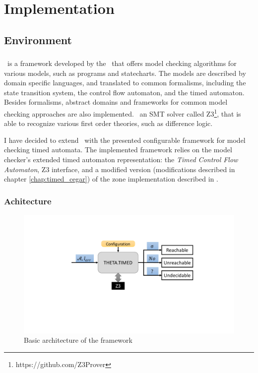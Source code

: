 \chapter{Implementation}\label{chap:impl}

\section{Environment}

\subsection{\ttmc}

\ttmc\ is a framework developed by the \bmemit\ that offers model checking algorithms for various models, such as programs and statecharts. The models are described by domain specific languages, and translated to common formalisms, including the state transition system, the control flow automaton, and the timed automaton. Besides formalisms, abstract domains and frameworks for common model checking approaches are also implemented. \ttmc \  an SMT solver called Z3\footnote{https://github.com/Z3Prover}, that is able to recognize various first order theories, such as difference logic.

I have decided to extend \ttmc\ with the presented configurable framework for model checking timed automata. The implemented framework relies on the model checker's extended timed automaton representation: the \emph{Timed Control Flow Automaton}, Z3 interface, and a modified version (modifications described in chapter \ref{chap:timed_cegar}) of the zone implementation described in \cite{bengtsson2004timed}.

\subsection{Achitecture}

\begin{figure}
	\centering
	\includegraphics[width=.7\textwidth]{include/figures/architecture}
	\caption{Basic architecture of the framework}
	\label{fig:arc}
\end{figure}

